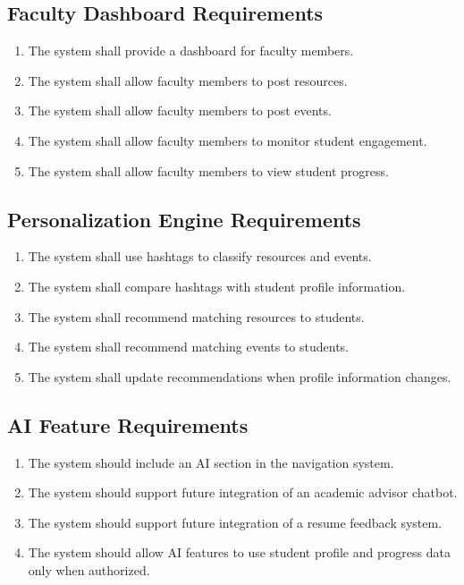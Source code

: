 \documentclass{scrreprt}
\begin{document}
\subsection{Faculty Dashboard Requirements}
\begin{enumerate}
    \item The system shall provide a dashboard for faculty members.
    \item The system shall allow faculty members to post resources.
    \item The system shall allow faculty members to post events.
    \item The system shall allow faculty members to monitor student engagement.
    \item The system shall allow faculty members to view student progress.
\end{enumerate}

\subsection{Personalization Engine Requirements}
\begin{enumerate}
    \item The system shall use hashtags to classify resources and events.
    \item The system shall compare hashtags with student profile information.
    \item The system shall recommend matching resources to students.
    \item The system shall recommend matching events to students.
    \item The system shall update recommendations when profile information changes.
\end{enumerate}

\subsection{AI Feature Requirements}
\begin{enumerate}
    \item The system should include an AI section in the navigation system.
    \item The system should support future integration of an academic advisor chatbot.
    \item The system should support future integration of a resume feedback system.
    \item The system should allow AI features to use student profile and progress data only when authorized.
\end{enumerate}
\end{document}
